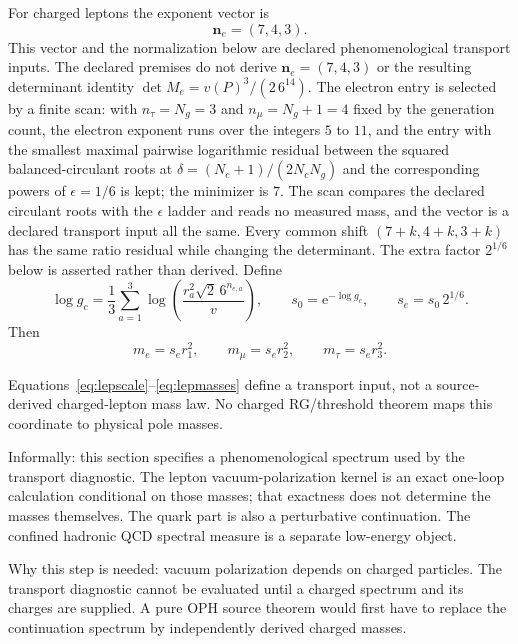 \documentclass[11pt]{article}
\theoremstyle{remark}
\newcommand{\e}{\mathrm e}
\begin{document}
For charged leptons the exponent vector is
\begin{equation}
\bm n_e=(7,4,3).
\label{eq:lepexp}
\end{equation}
This vector and the normalization below are declared phenomenological transport
inputs. The declared premises do not derive
\(\bm n_e=(7,4,3)\) or the resulting determinant identity
\(\det M_e=v(P)^3/(2\,6^{14})\). The electron entry is selected by a
finite scan: with \(n_\tau=N_g=3\) and \(n_\mu=N_g+1=4\) fixed by the
generation count, the electron exponent runs over the integers \(5\) to
\(11\), and the entry with the smallest maximal pairwise logarithmic residual
between the squared balanced-circulant roots at
\(\delta=(N_c+1)/(2N_cN_g)\) and the corresponding powers of \(\epsilon=1/6\)
is kept; the minimizer is \(7\). The scan compares the declared circulant
roots with the \(\epsilon\) ladder and reads no measured mass, and the
vector is a declared transport input all the same. Every common shift
\((7+k,4+k,3+k)\) has the same
ratio residual while changing the determinant.  The extra factor \(2^{1/6}\)
below is asserted rather than derived.
Define
\begin{equation}
\log g_c
=
\frac{1}{3}
\sum_{a=1}^3
\log\!\left(
\frac{r_a^2\sqrt2\,6^{n_{e,a}}}{v}
\right),
\qquad
s_0=\e^{-\log g_c},
\qquad
s_e=s_0\,2^{1/6}.
\label{eq:lepscale}
\end{equation}
Then
\begin{equation}
m_e=s_e r_1^2,
\qquad
m_\mu=s_e r_2^2,
\qquad
m_\tau=s_e r_3^2.
\label{eq:lepmasses}
\end{equation}

Equations~\eqref{eq:lepscale}--\eqref{eq:lepmasses} define a transport input,
not a source-derived charged-lepton mass law. No charged RG/threshold theorem
maps this coordinate to physical pole masses.

Informally: this section specifies a phenomenological spectrum used by the
transport diagnostic.  The lepton vacuum-polarization kernel is an exact
one-loop calculation conditional on those masses; that exactness does not
determine the masses themselves.  The quark part is also a perturbative
continuation. The confined hadronic QCD spectral measure is a separate
low-energy object.

Why this step is needed: vacuum polarization depends on charged particles. The
transport diagnostic cannot be evaluated until a charged spectrum and its
charges are supplied.  A pure OPH source theorem would first have to replace
the continuation spectrum by independently derived charged masses.
\end{document}
